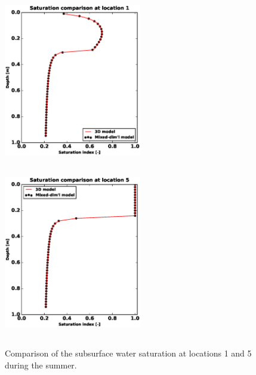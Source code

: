 \documentclass[review]{elsarticle}
\begin{document}



 \begin{figure}[!htpb]
\centering
\includegraphics[height = 7.5cm, width=6cm]{figures/comparison/regular/ss-sat/comp-sat-loc1-cycle0020.eps}
\includegraphics[height = 7.5cm, width=6cm]{figures/comparison/regular/ss-sat/comp-sat-loc5-cycle0020.eps}
\caption{Comparison of the subsurface water saturation at locations 1 and 5 during the summer.}
\label{ss-sat-comp}
\end{figure}
\end{document}
